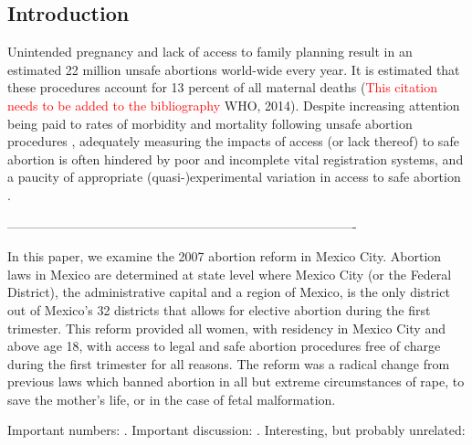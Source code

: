 \documentclass[a4paper, 11pt]{article}
\begin{document}
\begin{spacing}{1.5}
 
 
\newpage
\begin{multicols}{2}
\section{Introduction}
Unintended pregnancy and lack of access to family planning result in an 
estimated 22 million unsafe abortions world-wide every year.  It is estimated 
that these procedures account for 13 percent of all maternal deaths 
(\textcolor{red}{This citation needs to be added to the bibliography} WHO, 2014).  
Despite increasing attention being paid to rates of morbidity and mortality 
following unsafe abortion procedures \citep{Grimes2006,Brown2007,Kulczycki2011}, 
adequately measuring the impacts of access (or lack thereof) to safe abortion is 
often hindered by poor and incomplete vital registration systems, and a paucity of 
appropriate (quasi-)experimental variation in access to safe abortion 
\citep{Grimes2006}.


----------------------------------------------------------------------------------
 
 In this paper, we examine the 2007 abortion reform in Mexico City. Abortion laws in Mexico are determined at state level where Mexico City (or the Federal District), the administrative capital and a region of Mexico, is the only district out of Mexico's 32 districts that allows for elective abortion during the first trimester. This reform provided all women, with residency in Mexico City and above age 18, with access to legal and safe abortion procedures free of charge during the first trimester for all reasons. The reform was a radical change from previous laws which banned abortion in all but extreme circumstances of rape, to save the mother’s life, or in the case of fetal malformation. 

Important numbers: \citet{Sedghetal2007,Sedghetal2012}.
Important discussion: \citet{WinikoffSheldon2012}. 
Interesting, but probably unrelated: \citet{TempletonGrimes2011}


\end{multicols}
\end{spacing}
\end{document}
